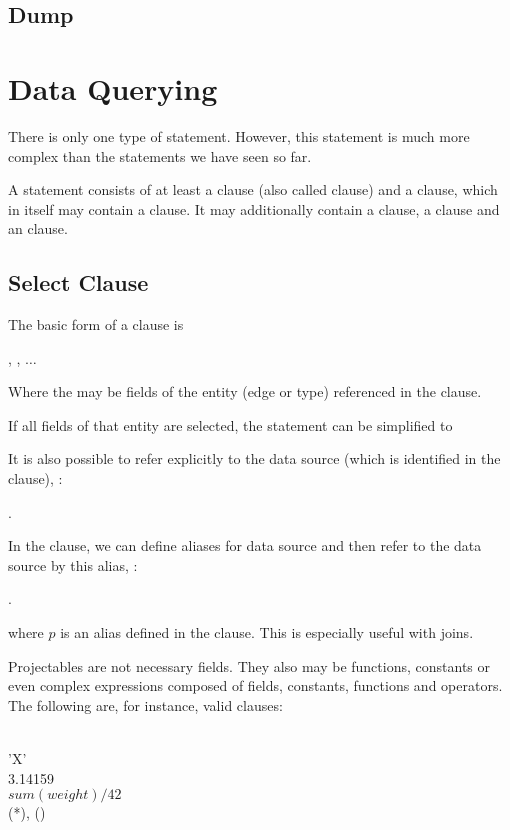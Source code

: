 \subsection{Dump}

\section{Data Querying}
There is only one type of  statement.
However, this statement is much more complex
than the statements we have seen so far.

A  statement consists of at least
a  clause (also called  clause)
and a  clause, which in itself may contain
a  clause.
It may additionally contain
a  clause,
a  clause and
an  clause.

\subsection{Select Clause}
The basic form of a  clause is

 , , $\dots$

Where the  may be fields of the entity (edge or type)
referenced in the  clause.

If all fields of that entity are selected,
the statement can be simplified to

 \keyword{*}

It is also possible to refer explicitly to the data source
(which is identified in the  clause), \eg:

 .

In the  clause, we can define aliases for data source
and then refer to the data source by this alias, \eg:

 .

where $p$ is an alias defined in the  clause.
This is especially useful with joins.

Projectables are not necessary fields.
They also may be functions, constants or even complex expressions
composed of fields, constants, functions and operators.
The following are, for instance, valid  clauses:

\begin{minipage}{\textwidth}
  \\
 'X' \\
 3.14159 \\
 $sum(weight)/42$ \\
 (*), ()
\end{minipage}

